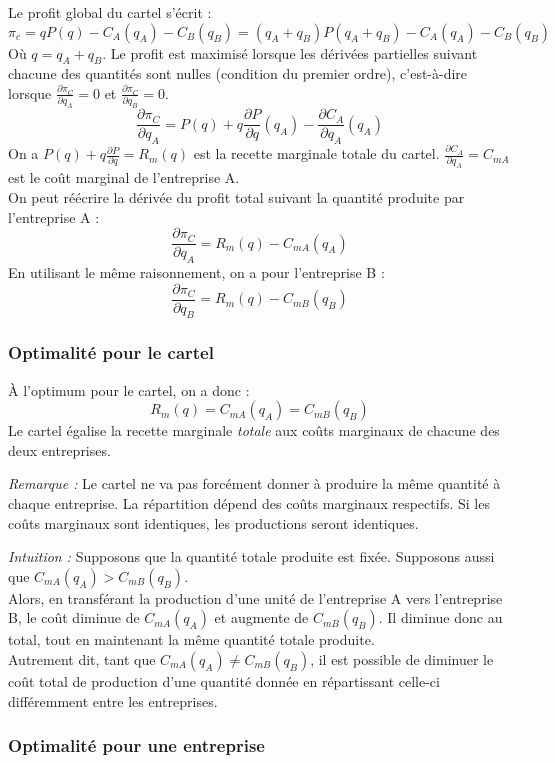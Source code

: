 \documentclass[
  a4paper,
]{book}
\theoremstyle{definition}
\theoremstyle{definition}
\theoremstyle{definition}
\theoremstyle{definition}
\theoremstyle{remark}
\begin{document}
Le profit global du cartel s'écrit :
\[
\pi_c=qP(q)-C_A(q_A)-C_B(q_B)=(q_A+q_B)P(q_A+q_B)-C_A(q_A)-C_B(q_B)
\]
Où \(q=q_A+q_B\).
Le profit est maximisé lorsque les dérivées partielles suivant chacune des quantités sont nulles (condition du premier ordre), c'est-à-dire lorsque \(\frac{\partial\pi_C}{\partial q_A}=0\) et \(\frac{\partial\pi_C}{\partial q_B}=0\).
\[
\frac{\partial\pi_C}{\partial q_A} = P(q) + q\frac{\partial P}{\partial q}(q_A)-\frac{\partial C_A}{\partial q_A}(q_A)
\]
On a \(P(q) + q\frac{\partial P}{\partial q}=R_m(q)\) est la recette marginale totale du cartel.
\(\frac{\partial C_A}{\partial q_A}=C_{mA}\) est le coût marginal de l'entreprise A.\\
On peut réécrire la dérivée du profit total suivant la quantité produite par l'entreprise A :
\[
\frac{\partial\pi_C}{\partial q_A} = R_m(q)  - C_{mA}(q_A)
\]
En utilisant le même raisonnement, on a pour l'entreprise B :
\[
\frac{\partial\pi_C}{\partial q_B} = R_m(q)  - C_{mB}(q_B)
\]

\hypertarget{optimalituxe9-pour-le-cartel}{%
\subsubsection{Optimalité pour le cartel}\label{optimalituxe9-pour-le-cartel}}

À l'optimum pour le cartel, on a donc :
\[R_m(q) = C_{mA}(q_A) = C_{mB}(q_B)\]
Le cartel égalise la recette marginale \emph{totale} aux coûts marginaux de chacune des deux entreprises.

\emph{Remarque :} Le cartel ne va pas forcément donner à produire la même quantité à chaque entreprise.
La répartition dépend des coûts marginaux respectifs.
Si les coûts marginaux sont identiques, les productions seront identiques.

\emph{Intuition :} Supposons que la quantité totale produite est fixée.
Supposons aussi que \(C_{mA}(q_A)>C_{mB}(q_B)\).\\
Alors, en transférant la production d'une unité de l'entreprise A vers l'entreprise B, le coût diminue de \(C_{mA}(q_A)\) et augmente de \(C_{mB}(q_B)\).
Il diminue donc au total, tout en maintenant la même quantité totale produite.\\
Autrement dit, tant que \(C_{mA}(q_A)\neq C_{mB}(q_B)\), il est possible de diminuer le coût total de production d'une quantité donnée en répartissant celle-ci différemment entre les entreprises.

\hypertarget{optimalituxe9-pour-une-entreprise}{%
\subsubsection{Optimalité pour une entreprise}\label{optimalituxe9-pour-une-entreprise}}
\end{document}
